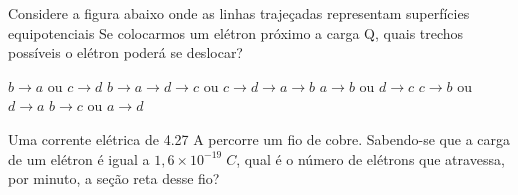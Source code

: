 \documentclass[12pt, addpoints]{exam}
\begin{document}
    \begin{questions}
\begin{multicols*}{2}
\question Considere a figura abaixo onde as linhas trajeçadas representam superfícies equipotenciais Se colocarmos um elétron próximo a carga Q, quais trechos possíveis o elétron poderá se deslocar?
        
        \begin{center}
            \begin{minipage}[c]{0.5\linewidth}
            \end{minipage}
        \end{center}
        
        

\begin{choices}
\choice $b\rightarrow a$ ou $c\rightarrow d$ 
\choice $b\rightarrow a\rightarrow d\rightarrow c$ ou $c\rightarrow d\rightarrow a\rightarrow b$ 
\choice $a\rightarrow b$ ou $d\rightarrow c$ 
\choice $c\rightarrow b$ ou $d\rightarrow a$ 
\choice $b\rightarrow c$ ou $a\rightarrow d$ 
\end{choices}
\question Uma corrente elétrica de    4.27 A percorre um ﬁo de cobre. Sabendo-se que a carga de um elétron é igual a $1,6\times 10^{-19}\;C$, qual é o número de elétrons que atravessa, por minuto, a seção reta desse ﬁo?


\end{multicols*}
\end{questions}
\end{document}

